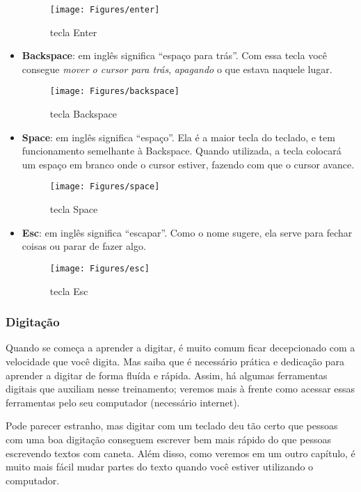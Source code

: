 \documentclass[hidelinks,12pt]{article}
\begin{document}
\begin{itemize}
{	\begin{figure}[!h]
	    \centering
		\texttt{[image: Figures/enter]}
		\label{fig:enter}
		\caption{tecla Enter}
	\end{figure}
	}

	\item { \textbf{Backspace}: em inglês significa ``espaço para trás''. Com essa tecla você consegue \emph{mover o cursor para trás}, \emph{apagando} o que estava naquele lugar.
	
    \begin{figure}[!h]
	    \centering
		\texttt{[image: Figures/backspace]}
		\label{fig:backspace}
		\caption{tecla Backspace}
	\end{figure}
	}

	\item { \textbf{Space}: em inglês significa ``espaço''. Ela é a maior tecla do teclado, e tem funcionamento semelhante à Backspace. Quando utilizada, a tecla colocará um espaço em branco onde o cursor estiver, fazendo com que o cursor avance.
    
    \begin{figure}[!h]
	    \centering
		\texttt{[image: Figures/space]}
		\label{fig:space}
		\caption{tecla Space}
	\end{figure}
	}

	\item { \textbf{Esc}: em inglês significa ``escapar''. Como o nome sugere, ela serve para fechar coisas ou parar de fazer algo.
	
	\begin{figure}[!h]
	    \centering
		\texttt{[image: Figures/esc]}
		\label{fig:esc}
		\caption{tecla Esc}
	\end{figure}
	}

\end{itemize}

\subsubsection{Digitação}

Quando se começa a aprender a digitar, é muito comum ficar decepcionado com a velocidade que você digita. Mas saiba que é necessário  prática e dedicação para aprender a digitar de forma fluída e rápida. Assim, há algumas ferramentas digitais que auxiliam nesse treinamento; veremos mais à frente como acessar essas ferramentas pelo seu computador (necessário internet).

Pode parecer estranho, mas digitar com um teclado deu tão certo que pessoas com uma boa digitação conseguem escrever bem mais rápido do que pessoas escrevendo textos com caneta. Além disso, como veremos em um outro capítulo, é muito mais fácil mudar partes do texto quando você estiver utilizando o computador.
\end{document}
